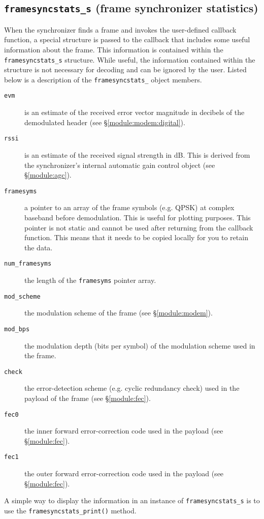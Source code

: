 \subsection{{\tt framesyncstats\_s} (frame synchronizer statistics)}
\label{module:framing:framesyncstats_s}
When the synchronizer finds a frame and invokes the user-defined
callback function, a special structure is passed to the callback that
includes some useful information about the frame.
This information is contained within the {\tt framesyncstats\_s}
structure.
While useful, the information contained within the structure is not
necessary for decoding and can be ignored by the user.
Listed below is a description of the {\tt framesyncstats\_} object
members.
%
\begin{description}
\item[{\tt evm}]
    is an estimate of the received error vector magnitude in decibels of
    the demodulated header
    (see \S\ref{module:modem:digital}).
\item[{\tt rssi}]
    is an estimate of the received signal strength in dB.
    This is derived from the synchronizer's internal automatic gain
    control object (see \S\ref{module:agc}).
\item[{\tt framesyms}]
    a pointer to an array of the frame symbols (e.g. QPSK) at complex
    baseband before demodulation.
    This is useful for plotting purposes.
    This pointer is not static and cannot be used after returning from
    the callback function.
    This means that it needs to be copied locally for you to retain the
    data.
\item[{\tt num\_framesyms}]
    the length of the {\tt framesyms} pointer array.
\item[{\tt mod\_scheme}]
    the modulation scheme of the frame (see \S\ref{module:modem}).
\item[{\tt mod\_bps}]
    the modulation depth (bits per symbol) of the modulation scheme used
    in the frame.
\item[{\tt check}]
    the error-detection scheme (e.g. cyclic redundancy check)
    used in the payload of the frame (see \S\ref{module:fec}).
\item[{\tt fec0}]
    the inner forward error-correction code used in the payload
    (see \S\ref{module:fec}).
\item[{\tt fec1}]
    the outer forward error-correction code used in the payload
    (see \S\ref{module:fec}).
\end{description}
%
A simple way to display the information in an instance of
{\tt framesyncstats\_s} is to use the {\tt framesyncstats\_print()}
method.


